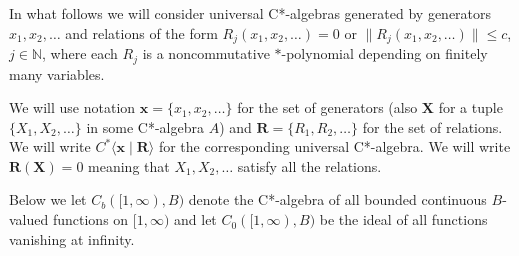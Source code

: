 \documentclass{article}%
\begin{document}
In what follows we will consider universal C*-algebras generated by generators $x_1, x_2, \ldots$ and relations of the form $R_j(x_1, x_2, \ldots)=0$ or $\|R_j(x_1, x_2, \ldots)\|\le c$, $j\in \mathbb N$, where each $R_j$ is a noncommutative $\ast$-polynomial depending on finitely many variables.

We will use notation $\mathbf x = \{x_1, x_2, \ldots\}$ for the set of generators (also $\mathbf X$ for a tuple $\{X_1, X_2, \ldots\}$ in some C*-algebra $A$) and $\mathbf R = \{R_1, R_2, \ldots\}$ for the set of relations. We will write $C^*\langle \mathbf x\;|\;\mathbf R\rangle $ for the corresponding universal C*-algebra. We will write $\mathbf R(\mathbf X) =0$ meaning that $X_1, X_2, \ldots$ satisfy all the relations.

Below we let $C_b([1, \infty), B)$ denote the C*-algebra of all bounded continuous $B$-valued functions on $[1, \infty)$ and let $C_0([1, \infty), B)$ be the ideal of all functions vanishing at infinity.
\end{document}
